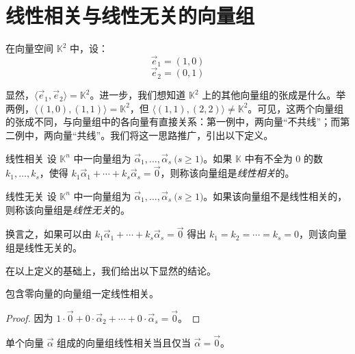 
\section{线性相关与线性无关的向量组}

在向量空间 $\mathbb K^2$ 中，设：
$$
	\vec e_1 = (1, 0)
$$$$
	\vec e_2 = (0, 1)
$$

显然，$\langle \vec e_1, \vec e_2 \rangle = \mathbb K^2$。进一步，我们想知道 $\mathbb K^2$ 上的其他向量组的张成是什么。举两例，$\langle (1, 0), (1, 1) \rangle = \mathbb K^2$，但 $\langle (1, 1), (2, 2) \rangle \ne \mathbb K^2$。可见，这两个向量组的张成不同，与向量组中的各向量有直接关系：第一例中，两向量“不共线”；而第二例中，两向量“共线”。我们将这一思路推广，引出以下定义。

\begin{definition}{线性相关}
	设 $\mathbb K^n$ 中一向量组为 $\vec \alpha_1, \ldots, \vec \alpha_s \pod{s \ge 1}$。如果 $\mathbb K$ 中有不全为 $0$ 的数 $k_1, \ldots, k_s$，使得 $k_1 \vec \alpha_1 + \cdots + k_s \vec \alpha_s = \vec 0$，则称该向量组是\emph{线性相关}的。
\end{definition}

\begin{definition}{线性无关}
	设 $\mathbb K^n$ 中一向量组为 $\vec \alpha_1, \ldots, \vec \alpha_s \pod{s \ge 1}$。如果该向量组不是线性相关的，则称该向量组是\emph{线性无关}的。

	换言之，如果可以由 $k_1 \vec \alpha_1 + \cdots + k_s \vec \alpha_s = \vec 0$ 得出 $k_1 = k_2 = \cdots = k_s = 0$，则该向量组是线性无关的。
\end{definition}

在以上定义的基础上，我们给出以下显然的结论。

\begin{theorem}
	包含零向量的向量组一定线性相关。
\end{theorem}

\begin{proof}
	因为 $1 \cdot \vec 0 + 0 \cdot \vec \alpha_2 + \cdots + 0 \cdot \vec \alpha_s = \vec 0$。
\end{proof}

\begin{theorem}
	单个向量 $\vec \alpha$ 组成的向量组线性相关当且仅当 $\vec \alpha = \vec 0$。
\end{theorem}

